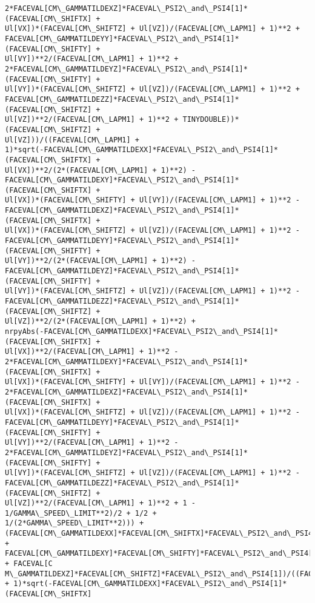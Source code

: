 \documentclass[landscape,letterpaper,10pt,english]{article}
\begin{document}
\begin{Verbatim}[commandchars=\\\{\}]
2*FACEVAL[CM\_GAMMATILDEXZ]*FACEVAL\_PSI2\_and\_PSI4[1]*(FACEVAL[CM\_SHIFTX] +
Ul[VX])*(FACEVAL[CM\_SHIFTZ] + Ul[VZ])/(FACEVAL[CM\_LAPM1] + 1)**2 +
FACEVAL[CM\_GAMMATILDEYY]*FACEVAL\_PSI2\_and\_PSI4[1]*(FACEVAL[CM\_SHIFTY] +
Ul[VY])**2/(FACEVAL[CM\_LAPM1] + 1)**2 +
2*FACEVAL[CM\_GAMMATILDEYZ]*FACEVAL\_PSI2\_and\_PSI4[1]*(FACEVAL[CM\_SHIFTY] +
Ul[VY])*(FACEVAL[CM\_SHIFTZ] + Ul[VZ])/(FACEVAL[CM\_LAPM1] + 1)**2 +
FACEVAL[CM\_GAMMATILDEZZ]*FACEVAL\_PSI2\_and\_PSI4[1]*(FACEVAL[CM\_SHIFTZ] +
Ul[VZ])**2/(FACEVAL[CM\_LAPM1] + 1)**2 + TINYDOUBLE))*(FACEVAL[CM\_SHIFTZ] +
Ul[VZ]))/((FACEVAL[CM\_LAPM1] +
1)*sqrt(-FACEVAL[CM\_GAMMATILDEXX]*FACEVAL\_PSI2\_and\_PSI4[1]*(FACEVAL[CM\_SHIFTX] +
Ul[VX])**2/(2*(FACEVAL[CM\_LAPM1] + 1)**2) -
FACEVAL[CM\_GAMMATILDEXY]*FACEVAL\_PSI2\_and\_PSI4[1]*(FACEVAL[CM\_SHIFTX] +
Ul[VX])*(FACEVAL[CM\_SHIFTY] + Ul[VY])/(FACEVAL[CM\_LAPM1] + 1)**2 -
FACEVAL[CM\_GAMMATILDEXZ]*FACEVAL\_PSI2\_and\_PSI4[1]*(FACEVAL[CM\_SHIFTX] +
Ul[VX])*(FACEVAL[CM\_SHIFTZ] + Ul[VZ])/(FACEVAL[CM\_LAPM1] + 1)**2 -
FACEVAL[CM\_GAMMATILDEYY]*FACEVAL\_PSI2\_and\_PSI4[1]*(FACEVAL[CM\_SHIFTY] +
Ul[VY])**2/(2*(FACEVAL[CM\_LAPM1] + 1)**2) -
FACEVAL[CM\_GAMMATILDEYZ]*FACEVAL\_PSI2\_and\_PSI4[1]*(FACEVAL[CM\_SHIFTY] +
Ul[VY])*(FACEVAL[CM\_SHIFTZ] + Ul[VZ])/(FACEVAL[CM\_LAPM1] + 1)**2 -
FACEVAL[CM\_GAMMATILDEZZ]*FACEVAL\_PSI2\_and\_PSI4[1]*(FACEVAL[CM\_SHIFTZ] +
Ul[VZ])**2/(2*(FACEVAL[CM\_LAPM1] + 1)**2) +
nrpyAbs(-FACEVAL[CM\_GAMMATILDEXX]*FACEVAL\_PSI2\_and\_PSI4[1]*(FACEVAL[CM\_SHIFTX] +
Ul[VX])**2/(FACEVAL[CM\_LAPM1] + 1)**2 -
2*FACEVAL[CM\_GAMMATILDEXY]*FACEVAL\_PSI2\_and\_PSI4[1]*(FACEVAL[CM\_SHIFTX] +
Ul[VX])*(FACEVAL[CM\_SHIFTY] + Ul[VY])/(FACEVAL[CM\_LAPM1] + 1)**2 -
2*FACEVAL[CM\_GAMMATILDEXZ]*FACEVAL\_PSI2\_and\_PSI4[1]*(FACEVAL[CM\_SHIFTX] +
Ul[VX])*(FACEVAL[CM\_SHIFTZ] + Ul[VZ])/(FACEVAL[CM\_LAPM1] + 1)**2 -
FACEVAL[CM\_GAMMATILDEYY]*FACEVAL\_PSI2\_and\_PSI4[1]*(FACEVAL[CM\_SHIFTY] +
Ul[VY])**2/(FACEVAL[CM\_LAPM1] + 1)**2 -
2*FACEVAL[CM\_GAMMATILDEYZ]*FACEVAL\_PSI2\_and\_PSI4[1]*(FACEVAL[CM\_SHIFTY] +
Ul[VY])*(FACEVAL[CM\_SHIFTZ] + Ul[VZ])/(FACEVAL[CM\_LAPM1] + 1)**2 -
FACEVAL[CM\_GAMMATILDEZZ]*FACEVAL\_PSI2\_and\_PSI4[1]*(FACEVAL[CM\_SHIFTZ] +
Ul[VZ])**2/(FACEVAL[CM\_LAPM1] + 1)**2 + 1 - 1/GAMMA\_SPEED\_LIMIT**2)/2 + 1/2 +
1/(2*GAMMA\_SPEED\_LIMIT**2))) +
(FACEVAL[CM\_GAMMATILDEXX]*FACEVAL[CM\_SHIFTX]*FACEVAL\_PSI2\_and\_PSI4[1] +
FACEVAL[CM\_GAMMATILDEXY]*FACEVAL[CM\_SHIFTY]*FACEVAL\_PSI2\_and\_PSI4[1] + FACEVAL[C
M\_GAMMATILDEXZ]*FACEVAL[CM\_SHIFTZ]*FACEVAL\_PSI2\_and\_PSI4[1])/((FACEVAL[CM\_LAPM1]
+ 1)*sqrt(-FACEVAL[CM\_GAMMATILDEXX]*FACEVAL\_PSI2\_and\_PSI4[1]*(FACEVAL[CM\_SHIFTX]

\end{Verbatim}
\end{document}
